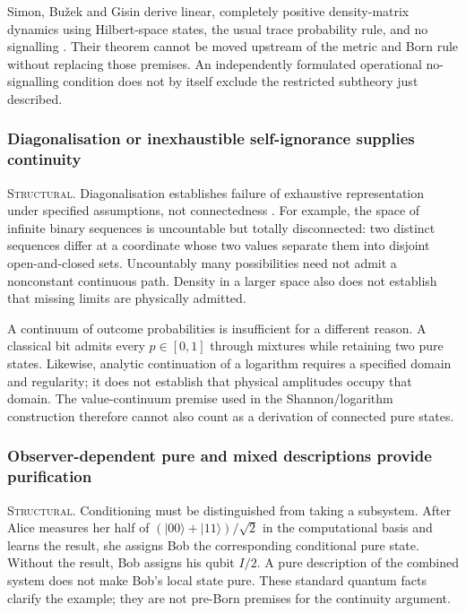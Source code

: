 Simon, Bužek and Gisin derive linear, completely positive density-matrix
dynamics using Hilbert-space states, the usual trace probability rule, and
no signalling \autocite{simon2001nosignaling}. Their theorem cannot be moved
upstream of the metric and Born rule without replacing those premises.
An independently formulated operational no-signalling condition does not
by itself exclude the restricted subtheory just described.

\subsubsection{Diagonalisation or inexhaustible self-ignorance supplies continuity}
\label{app:continuity-diagonal}

\noindent\textsc{Structural.}
Diagonalisation establishes failure of exhaustive representation under
specified assumptions, not connectedness \autocite{Yanofsky2003}. For example,
the space of infinite binary sequences is uncountable but totally disconnected:
two distinct sequences differ at a coordinate whose two values separate
them into disjoint open-and-closed sets. Uncountably many possibilities
need not admit a nonconstant continuous path. Density in a larger space
also does not establish that missing limits are physically admitted.

A continuum of outcome probabilities is insufficient for a different
reason. A classical bit admits every $p\in[0,1]$ through mixtures while
retaining two pure states. Likewise, analytic continuation of a logarithm
requires a specified domain and regularity; it does not establish that
physical amplitudes occupy that domain. The value-continuum premise used
in the Shannon/logarithm construction therefore cannot also count as a
derivation of connected pure states.

\subsubsection{Observer-dependent pure and mixed descriptions provide purification}
\label{app:continuity-purification}

\noindent\textsc{Structural.}
Conditioning must be distinguished from taking a subsystem. After Alice
measures her half of $(|00\rangle+|11\rangle)/\sqrt{2}$ in the computational
basis and learns the result, she assigns Bob the corresponding conditional
pure state. Without the result, Bob assigns his qubit $I/2$. A pure
description of the combined system does not make Bob's local state pure.
These standard quantum facts clarify the example; they are not pre-Born
premises for the continuity argument.

